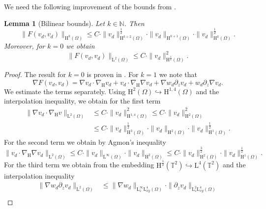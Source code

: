\documentclass[preprint]{elsarticle}
\newtheorem{lem}[lem]{Lemma}
\numberwithin{equation}{section}
\newcommand {\N}	{\mathbb{N}}
\newcommand {\T}	{\mathbb{T}}
\renewcommand{\H}{\mathrm{H}}
\newcommand{\nablaH}{\nabla_{\H}}
\newcommand{\rL}{\mathrm{L}}
\newcommand{\rH}{\H}
\begin{document}
We need the following improvement of the bounds from \cite[Corollary 6.2]{GGHHK:20_2}.

\begin{lem}[Bilinear bounds]\label{lem:bilinear bounds_2}
	Let $k \in \N$. Then 
	\begin{equation*}
		\| F (v_d,v_d) \|_{\rH^{k}(\Omega)}
		\leq C \cdot 
		\| v_d \|_{\rH^{k+2}(\Omega)}^{\frac{1}{2}} \cdot \| v_d \|_{\rH^{k+1}(\Omega)} \cdot 
		\| v_d \|_{\rH^{k}(\Omega)}^{\frac{1}{2}} .
	\end{equation*}
	Moreover, for $k = 0$ we obtain
	\begin{equation*}
		\| F (v_d,v_d) \|_{\rL^2(\Omega)}  
		\leq C \cdot 
		\| v_d \|_{\rH^{\frac{3}{2}}(\Omega)}^2 .
	\end{equation*}
\end{lem}
\begin{proof}
	The result for $k = 0$ is proven in \cite[Lemma 5.1]{HK:16_2}.
	For $k = 1$ we note that
	\begin{equation*}
		\nabla F(v_d,v_d)
		= \nabla v_d \cdot \nablaH v_d + v_d \cdot \nablaH \nabla v_d + \nabla w_d \partial_z v_d  + w_d \partial_z \nabla v_d . 
	\end{equation*}
	We estimate the terms separately. 
	Using $\rH^2(\Omega) \hookrightarrow \rH^{1,4}(\Omega)$ and the interpolation inequality, we obtain for the first term
	\begin{align*}
		\| \nabla v_d \cdot \nablaH v\|_{\rL^2(\Omega)}
		&\leq C \cdot \| v_d \|_{\rH^{1,4}(\Omega)}^2
		\leq C \cdot \| v_d \|_{\rH^{2}(\Omega)}^2 \\
		&\leq C \cdot \| v_d \|_{\rH^{3}(\Omega)}^{\frac{1}{2}} \cdot 
		\| v_d \|_{\rH^{2}(\Omega)} \cdot 
		\| v_d \|_{\rH^{1}(\Omega)}^{\frac{1}{2}} .
	\end{align*}
	For the second term we obtain by Agmon's inequality
	\begin{equation*}
		\| v_d \cdot \nablaH \nabla v_d \|_{\rL^2(\Omega)}
		\leq C \cdot \| v_d \|_{\rL^\infty(\Omega)} \cdot \| v_d \|_{\rH^2(\Omega)}
		\leq C \cdot \| v_d \|_{\rH^2(\Omega)}^{\frac{3}{2}} \cdot \| v_d \|_{\rH^1(\Omega)}^{\frac{1}{2}} .
	\end{equation*}
	For the third term we obtain from the embedding $\rH^{\frac{1}{2}}(\T^2) \hookrightarrow \rL^4(\T^2)$ and the interpolation inequality
	\begin{align*}
		\| \nabla w_d \partial_z v_d \|_{\rL^2(\Omega)}
		&\leq \| \nabla w_d \|_{\rL^\infty_z \rL^4_{xy}(\Omega)} \cdot \| \partial_z v_d \|_{\rL^2_z \rL^4_{xy}(\Omega)} \\

\end{align*}
\end{proof}
\end{document}
